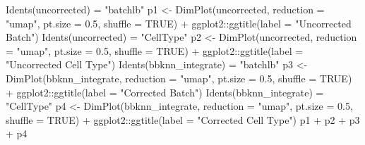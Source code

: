 \documentclass[
]{book}
\newenvironment{Shaded}{\begin{snugshade}}{\end{snugshade}}
\newcommand{\AttributeTok}[1]{\textcolor[rgb]{0.77,0.63,0.00}{#1}}
\newcommand{\ConstantTok}[1]{\textcolor[rgb]{0.00,0.00,0.00}{#1}}
\newcommand{\FloatTok}[1]{\textcolor[rgb]{0.00,0.00,0.81}{#1}}
\newcommand{\FunctionTok}[1]{\textcolor[rgb]{0.00,0.00,0.00}{#1}}
\newcommand{\NormalTok}[1]{#1}
\newcommand{\OtherTok}[1]{\textcolor[rgb]{0.56,0.35,0.01}{#1}}
\newcommand{\SpecialCharTok}[1]{\textcolor[rgb]{0.00,0.00,0.00}{#1}}
\newcommand{\StringTok}[1]{\textcolor[rgb]{0.31,0.60,0.02}{#1}}
\begin{document}
\begin{Shaded}
\begin{Highlighting}[]
\FunctionTok{Idents}\NormalTok{(uncorrected) }\OtherTok{=} \StringTok{"batchlb"}
\NormalTok{p1 }\OtherTok{\textless{}{-}} \FunctionTok{DimPlot}\NormalTok{(uncorrected, }\AttributeTok{reduction =} \StringTok{"umap"}\NormalTok{, }\AttributeTok{pt.size =} \FloatTok{0.5}\NormalTok{, }\AttributeTok{shuffle =} \ConstantTok{TRUE}\NormalTok{) }\SpecialCharTok{+}\NormalTok{ ggplot2}\SpecialCharTok{::}\FunctionTok{ggtitle}\NormalTok{(}\AttributeTok{label =} \StringTok{"Uncorrected Batch"}\NormalTok{)}
\FunctionTok{Idents}\NormalTok{(uncorrected) }\OtherTok{=} \StringTok{"CellType"}
\NormalTok{p2 }\OtherTok{\textless{}{-}} \FunctionTok{DimPlot}\NormalTok{(uncorrected, }\AttributeTok{reduction =} \StringTok{"umap"}\NormalTok{, }\AttributeTok{pt.size =} \FloatTok{0.5}\NormalTok{, }\AttributeTok{shuffle =} \ConstantTok{TRUE}\NormalTok{) }\SpecialCharTok{+}\NormalTok{ ggplot2}\SpecialCharTok{::}\FunctionTok{ggtitle}\NormalTok{(}\AttributeTok{label =} \StringTok{"Uncorrected Cell Type"}\NormalTok{)}
\FunctionTok{Idents}\NormalTok{(bbknn\_integrate) }\OtherTok{=} \StringTok{"batchlb"}
\NormalTok{p3 }\OtherTok{\textless{}{-}} \FunctionTok{DimPlot}\NormalTok{(bbknn\_integrate, }\AttributeTok{reduction =} \StringTok{"umap"}\NormalTok{, }\AttributeTok{pt.size =} \FloatTok{0.5}\NormalTok{, }\AttributeTok{shuffle =} \ConstantTok{TRUE}\NormalTok{) }\SpecialCharTok{+}\NormalTok{ ggplot2}\SpecialCharTok{::}\FunctionTok{ggtitle}\NormalTok{(}\AttributeTok{label =} \StringTok{"Corrected Batch"}\NormalTok{)}
\FunctionTok{Idents}\NormalTok{(bbknn\_integrate) }\OtherTok{=} \StringTok{"CellType"}
\NormalTok{p4 }\OtherTok{\textless{}{-}} \FunctionTok{DimPlot}\NormalTok{(bbknn\_integrate, }\AttributeTok{reduction =} \StringTok{"umap"}\NormalTok{, }\AttributeTok{pt.size =} \FloatTok{0.5}\NormalTok{, }\AttributeTok{shuffle =} \ConstantTok{TRUE}\NormalTok{) }\SpecialCharTok{+}\NormalTok{ ggplot2}\SpecialCharTok{::}\FunctionTok{ggtitle}\NormalTok{(}\AttributeTok{label =} \StringTok{"Corrected Cell Type"}\NormalTok{)}
\NormalTok{p1 }\SpecialCharTok{+}\NormalTok{ p2 }\SpecialCharTok{+}\NormalTok{ p3 }\SpecialCharTok{+}\NormalTok{ p4}
\end{Highlighting}
\end{Shaded}
\end{document}

